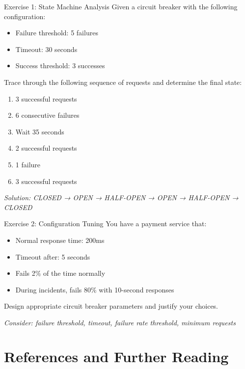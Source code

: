 \documentclass[12pt,a4paper]{article}
\begin{document}
\begin{interactivebox}{Exercise 1: State Machine Analysis}
Given a circuit breaker with the following configuration:
\begin{itemize}
    \item Failure threshold: 5 failures
    \item Timeout: 30 seconds
    \item Success threshold: 3 successes
\end{itemize}

Trace through the following sequence of requests and determine the final state:
\begin{enumerate}
    \item 3 successful requests
    \item 6 consecutive failures
    \item Wait 35 seconds
    \item 2 successful requests
    \item 1 failure
    \item 3 successful requests
\end{enumerate}

\textit{Solution: CLOSED → OPEN → HALF-OPEN → OPEN → HALF-OPEN → CLOSED}
\end{interactivebox}

\begin{interactivebox}{Exercise 2: Configuration Tuning}
You have a payment service that:
\begin{itemize}
    \item Normal response time: 200ms
    \item Timeout after: 5 seconds
    \item Fails 2\% of the time normally
    \item During incidents, fails 80\% with 10-second responses
\end{itemize}

Design appropriate circuit breaker parameters and justify your choices.

\textit{Consider: failure threshold, timeout, failure rate threshold, minimum requests}
\end{interactivebox}

\section{References and Further Reading}
\end{document}
